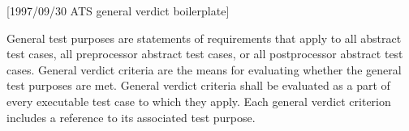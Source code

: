 [1997/09/30 ATS general verdict boilerplate]

    General test purposes are statements of requirements that apply
to all abstract test cases, all preprocessor abstract test cases,
or all postprocessor abstract test cases. General verdict criteria
are the means for evaluating whether the general test purposes are
met. General verdict criteria shall be evaluated as a part of every
executable test case to which they apply. Each general verdict criterion
includes a reference to its associated test purpose.

\endinput
